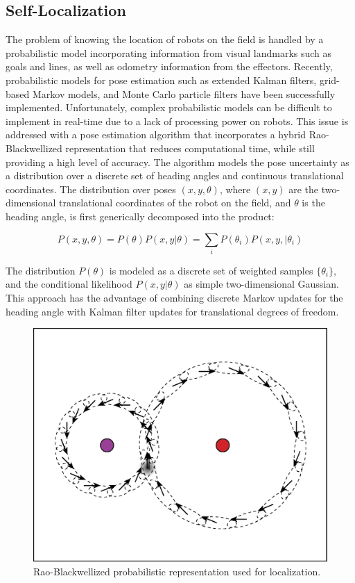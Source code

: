 \documentclass{article}
\begin{document}
\subsection{Self-Localization}
	The problem of knowing the location of robots on the field is handled by a probabilistic model incorporating information from visual landmarks such as goals and lines, as well as odometry information from the effectors. Recently, probabilistic models for pose estimation such as extended Kalman filters, grid-based Markov models, and Monte Carlo particle filters have been successfully implemented. Unfortunately, complex probabilistic models can be difficult to implement in real-time due to a lack of processing power on robots. This issue is addressed with a pose estimation algorithm that incorporates a hybrid Rao-Blackwellized representation that reduces computational time, while still providing a high level of accuracy. The algorithm models the pose uncertainty as a distribution over a discrete set of heading angles and continuous translational coordinates. The distribution over poses \((x,y,\theta)\), where \((x,y)\) are the two-dimensional translational coordinates of the robot on the field, and $\theta$ is the heading angle, is first generically decomposed into the product:

	\begin{equation}
		P(x,y,\theta) = P(\theta)P(x,y|\theta) = \sum\limits_{i} P(\theta_{i})P(x,y,|\theta_{i})
	\end{equation}

 	The distribution $P(\theta)$ is modeled as a discrete set of weighted samples $\{\theta_{i}\}$, and the conditional likelihood $P(x,y|\theta)$ as simple two-dimensional Gaussian. This approach has the advantage of combining discrete Markov updates for the heading angle with Kalman filter updates for translational degrees of freedom.
	\begin{figure}[H]
		\centering
		\includegraphics[width=.6\textwidth]{figures/RaoBlackwell.eps}
		\caption{Rao-Blackwellized probabilistic representation used for localization.}
		\label{fig:raoblack}
	\end{figure}
 
\end{document}
